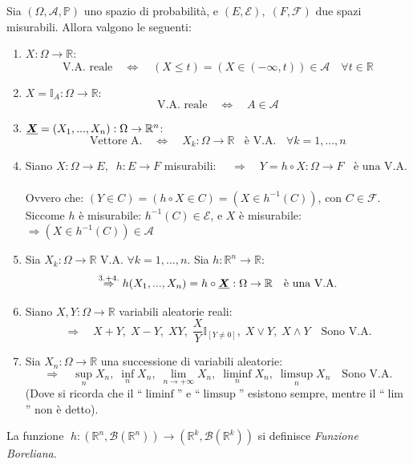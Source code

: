 \begin{teorema}
    Sia $(\Omega, \mathcal{A}, \mathbb{P})$ uno spazio di probabilità, e $(E, \mathcal{E}), \;(F, \mathcal{F})$ due spazi misurabili. Allora valgono le seguenti:
    \begin{enumerate}
    \label{th:propVA}
        \item $X:\Omega\to\mathbb{R}$: \\
        \[\text{V.A. reale} \quad\iff\quad(X\leq t) = (X\in (-\infty, t))\in \mathcal{A}\quad \forall t\in\mathbb{R}\]
        \item $X=\mathbb{I}_A:\Omega\to \mathbb{R}$:
        \[\text{V.A. reale} \quad\iff\quad A\in\mathcal{A}\]
        \item $\underline{{\boldsymbol{X}}} = (X_1, ..., X_n):\Omega\to\mathbb{R}^n$:
        \[\text{Vettore A.}\quad \iff \quad X_k:\Omega\to \mathbb{R} \;\;\text{ è V.A. }\;\;\forall k = 1, ..., n\]
        \item Siano $X:\Omega\to E,\;\; h:E\to F$ misurabili:
        \(\quad \Rightarrow\quad Y = h\circ X:\Omega\to F\;\;\text{ è una V.A.}\)\\
        \\
        Ovvero che: \((Y \in C) = (h\circ X\in C) = (X\in h^{-1}(C))\), con \(C\in\mathcal{F}\). Siccome $h$ è misurabile: \( h^{-1}(C)\in\mathcal{E}\), e $X$ è misurabile: \(\Rightarrow(X\in h^{-1}(C))\in\mathcal{A}\)
        \item Sia $X_k:\Omega\to\mathbb{R}$ V.A. $\forall k=1, ..., n$. Sia $h:\mathbb{R}^n\to \mathbb{R}$:
        \[\overset{3.+4.}{\Rightarrow} h(X_1, ..., X_n) = h\circ \underline{{\boldsymbol{X}}}:\Omega\to\mathbb{R}\quad \text{è una V.A.}\]
        \item Siano $X, Y:\Omega\to\mathbb{R}$ variabili aleatorie reali:
        \[\Rightarrow\quad X+Y,\; X-Y, \;XY,\; \frac{X}{Y}\mathbb{I}_{[Y\neq0]},\;X \vee Y,\;X \wedge Y \quad \text{Sono V.A.}\]
        \item Sia $X_n:\Omega\to \mathbb{R}$ una successione di variabili aleatorie:
        \[\Rightarrow\quad \sup_nX_n, \; \inf_nX_n, \;\lim_{n\to+\infty}X_n, \; \liminf_n X_n, \; \limsup_nX_n\quad \text{Sono V.A.}\]
        (Dove si ricorda che il ``$\liminf$'' e ``$\limsup$'' esistono sempre, mentre il ``$\lim$'' non è detto).
    \end{enumerate}
\end{teorema}
\begin{definizione}
    La funzione $\;h:(\mathbb{R}^n, \mathcal{B}(\mathbb{R}^n))\to (\mathbb{R}^k, \mathcal{B}(\mathbb{R}^k))$ si definisce \textit{Funzione Boreliana}.
\end{definizione}

